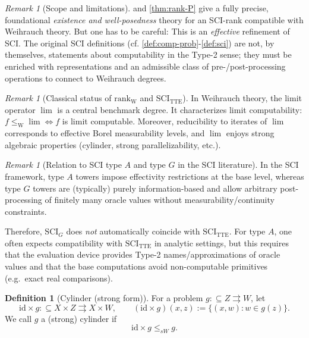 \documentclass{lmcs} %
\theoremstyle{plain}
\theoremstyle{plain}
\theoremstyle{definition}
\newtheorem{definition}[theorem]{Definition}
\theoremstyle{remark}
\newtheorem{remark}[theorem]{Remark}
\theoremstyle{definition}
\theoremstyle{remark}
\numberwithin{equation}{section}
\begin{document}
\begin{remark}[Scope and limitations]\label{rem:scope}
 and \cref{thm:rank-P} give a fully precise, foundational \textit{existence and well-posedness} theory for an SCI-rank compatible with Weihrauch theory. But one has to be careful: This is an \textit{effective} refinement of SCI.
The original SCI definitions (cf. \cref{def:comp-prob}-\cref{def:sci}) are not, by themselves,
statements about computability in the Type-2 sense; they must be enriched with representations and an admissible class of pre-/post-processing operations to connect to Weihrauch degrees.
\end{remark}

\begin{remark}[Classical status of $\mathrm{rank}_{\mathrm W}$ and $\mathrm{SCI}_{\mathrm{TTE}}$]
In Weihrauch theory, the limit operator $\lim$ is a central benchmark degree.
It characterizes limit computability: $f \le_{\mathrm W} \lim \iff f$ is limit computable.
Moreover, reducibility to iterates of $\lim$ corresponds to effective Borel measurability levels,
and $\lim$ enjoys strong algebraic properties (cylinder, strong parallelizability, etc.).
\end{remark}

\begin{remark}[Relation to SCI type $A$ and type $G$ in the SCI literature]
In the SCI framework, type $A$ towers impose effectivity restrictions at the base level,
whereas type $G$ towers are (typically) purely information-based and allow arbitrary
post-processing of finitely many oracle values without measurability/continuity constraints.

Therefore, $\mathrm{SCI}_G$ does \textit{not} automatically coincide with $\mathrm{SCI}_{\mathrm{TTE}}$.
For type $A$, one often expects compatibility with $\mathrm{SCI}_{\mathrm{TTE}}$ in analytic settings,
but this requires that the evaluation device provides Type-2 names/approximations of oracle values
and that the base computations avoid non-computable primitives (e.g.\ exact real comparisons).
\end{remark}

\begin{definition}[Cylinder (strong form)]
For a problem $g:\subseteq Z \rightrightarrows W$, let
\[
\mathrm{id}\times g:\subseteq X\times Z \rightrightarrows X\times W,
\qquad
(\mathrm{id}\times g)(x,z):=\{(x,w): w\in g(z)\}.
\]
We call $g$ a (strong) cylinder if
\[
\mathrm{id}\times g \leq_{sW} g.
\]
\end{definition}
\end{document}
